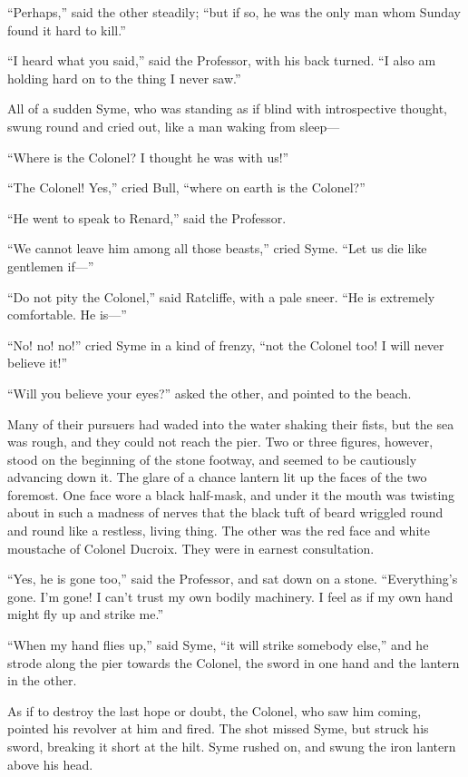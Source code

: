 “Perhaps,” said the other steadily; “but if so, he was the only man whom Sunday found it hard to kill.”

“I heard what you said,” said the Professor, with his back turned. “I also am holding hard on to the thing I never saw.”

All of a sudden Syme, who was standing as if blind with introspective thought, swung round and cried out, like a man waking from sleep⁠—

“Where is the Colonel? I thought he was with us!”

“The Colonel! Yes,” cried Bull, “where on earth is the Colonel?”

“He went to speak to Renard,” said the Professor.

“We cannot leave him among all those beasts,” cried Syme. “Let us die like gentlemen if⁠—”

“Do not pity the Colonel,” said Ratcliffe, with a pale sneer. “He is extremely comfortable. He is⁠—”

“No! no! no!” cried Syme in a kind of frenzy, “not the Colonel too! I will never believe it!”

“Will you believe your eyes?” asked the other, and pointed to the beach.

Many of their pursuers had waded into the water shaking their fists, but the sea was rough, and they could not reach the pier. Two or three figures, however, stood on the beginning of the stone footway, and seemed to be cautiously advancing down it. The glare of a chance lantern lit up the faces of the two foremost. One face wore a black half-mask, and under it the mouth was twisting about in such a madness of nerves that the black tuft of beard wriggled round and round like a restless, living thing. The other was the red face and white moustache of Colonel Ducroix. They were in earnest consultation.

“Yes, he is gone too,” said the Professor, and sat down on a stone. “Everything’s gone. I’m gone! I can’t trust my own bodily machinery. I feel as if my own hand might fly up and strike me.”

“When my hand flies up,” said Syme, “it will strike somebody else,” and he strode along the pier towards the Colonel, the sword in one hand and the lantern in the other.

As if to destroy the last hope or doubt, the Colonel, who saw him coming, pointed his revolver at him and fired. The shot missed Syme, but struck his sword, breaking it short at the hilt. Syme rushed on, and swung the iron lantern above his head.

